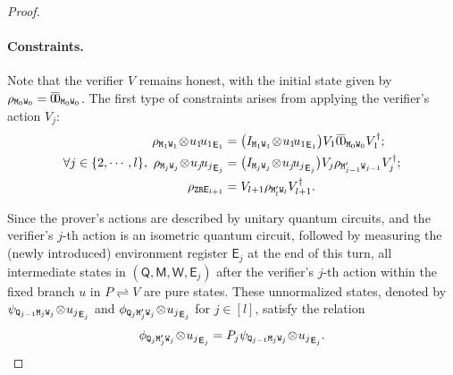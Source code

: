 \documentclass[11pt, a4paper]{article}
\numberwithin{equation}{section}
\numberwithin{figure}{section}
\newcommand{\protocol}[2]{{#1}\!\rightleftharpoons\!{#2}}
\let\ket\relax\DeclarePairedDelimiter\ket{\lvert}{\rangle}
\let\bra\relax\DeclarePairedDelimiter\bra{\langle}{\rvert}
\newcommand{\ketbra}[2]{\ensuremath{\ket{#1}\!\bra{#2}}}
\newcommand{\sfE}{\mathsf{E}}
\newcommand{\sfM}{\mathsf{M}}
\newcommand{\sfQ}{\mathsf{Q}}
\newcommand{\sfW}{\mathsf{W}}
\newcommand{\ttM}{\mathtt{M}}
\newcommand{\ttQ}{\mathtt{Q}}
\newcommand{\ttR}{\mathtt{R}}
\newcommand{\ttW}{\mathtt{W}}
\newcommand{\ttZ}{\mathtt{Z}}
\begin{document}
\begin{proof}
    \paragraph{Constraints.}
    Note that the verifier $V$ remains honest, with the initial state given by $\rho_{\ttM_0\ttW_0} = \ketbra{\bar{0}}{\bar{0}}_{\ttM_0\ttW_0}$.
    The first type of constraints arises from applying the verifier's action $V_j$:
    \begin{equation}
        \label{eq:QIPL-honest-verifier-cond}
        \begin{aligned}
            \rho_{\ttM_1\ttW_1} \!\otimes\! \ketbra{u_1}{u_1}_{\sfE_1} 
            &= \big( I_{\ttM_1\ttW_1}\!\otimes\!\ketbra{u_1}{u_1}_{\sfE_1}\big) V_1 \ketbra{\bar{0}}{\bar{0}}_{\ttM_0\ttW_0} V_1^{\dagger};\\
            \forall j \in \{2,\cdots,l\},~\rho_{\ttM_j\ttW_j} \!\otimes\! \ketbra{u_j}{u_j}_{\sfE_j} &= \big( I_{\ttM_j\ttW_j} \!\otimes\! \ketbra{u_j}{u_j}_{\sfE_j} \big) V_j \rho_{\ttM'_{j-1}\ttW_{j-1}} V_j^{\dagger};\\
            \rho_{\ttZ\ttR\sfE_{l+1}} &= V_{l+1} \rho_{\ttM'_l\ttW_l} V_{l+1}^{\dagger}.
        \end{aligned}
    \end{equation}

    Since the prover's actions are described by unitary quantum circuits, and the verifier's $j$-th action is an isometric quantum circuit, followed by measuring the (newly introduced) environment register $\sfE_j$ at the end of this turn, all intermediate states in $(\sfQ, \sfM, \sfW, \sfE_j)$ after the verifier's $j$-th action within the fixed branch $u$ in $\protocol{P}{V}$ are pure states.
    These unnormalized states, denoted by $\ket{\psi}_{\ttQ_{j-1}\ttM_j\ttW_j} \!\otimes\! \ket{u_j}_{\sfE_j}$ and $\ket{\phi}_{\ttQ_{j}\ttM'_j\ttW_j} \!\otimes\! \ket{u_j}_{\sfE_j}$ for $j \in [l]$, satisfy the relation
    \begin{equation}
        \label{eq:prover-action}
        \ket{\phi}_{\ttQ_{j}\ttM'_j\ttW_j} \!\otimes\! \ket{u_j}_{\sfE_j} = P_j \ket{\psi}_{\ttQ_{j-1}\ttM_j\ttW_j} \!\otimes\! \ket{u_j}_{\sfE_j}.
    \end{equation}
    

\end{proof}
\end{document}
